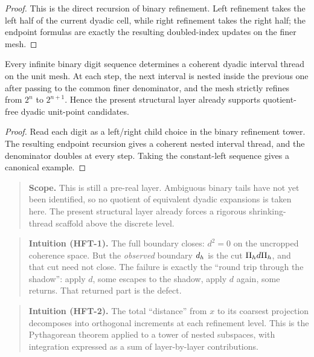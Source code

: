 \begin{proof}
This is the direct recursion of binary refinement.
Left refinement takes the left half of the current dyadic cell, while right refinement takes the right half; the endpoint formulas are exactly the resulting doubled-index updates on the finer mesh.
\end{proof}

\begin{proposition}\label{prop:dyadic-point-candidates}
Every infinite binary digit sequence determines a coherent dyadic interval thread on the unit mesh.
At each step, the next interval is nested inside the previous one after passing to the common finer denominator, and the mesh strictly refines from $2^n$ to $2^{n+1}$.
Hence the present structural layer already supports quotient-free dyadic
unit-point candidates.
\end{proposition}

\begin{proof}
Read each digit as a left/right child choice in the binary refinement tower.
The resulting endpoint recursion gives a coherent nested interval thread, and the denominator doubles at every step.
Taking the constant-left sequence gives a canonical example.
\end{proof}

\begin{quote}\small
\textbf{Scope.} This is still a pre-real layer.
Ambiguous binary tails have not yet been identified, so no quotient of equivalent dyadic expansions is taken here.
The present structural layer already forces a rigorous shrinking-thread
scaffold above the discrete level.
\end{quote}

\begin{quote}\small
\textbf{Intuition (HFT-1).} The full boundary closes: $d^2=0$ on the uncropped coherence space. But the \emph{observed} boundary $d_{h}$ is the cut $\Pi_{h} d \Pi_{h}$, and that cut need not close. The failure is exactly the ``round trip through the shadow'': apply $d$, some escapes to the shadow, apply $d$ again, some returns. That returned part is the defect.
\end{quote}

\begin{quote}\small
\textbf{Intuition (HFT-2).} The total ``distance'' from $x$ to its coarsest projection decomposes into orthogonal increments at each refinement level. This is the Pythagorean theorem applied to a tower of nested subspaces, with integration expressed as a sum of layer-by-layer contributions.
\end{quote}

